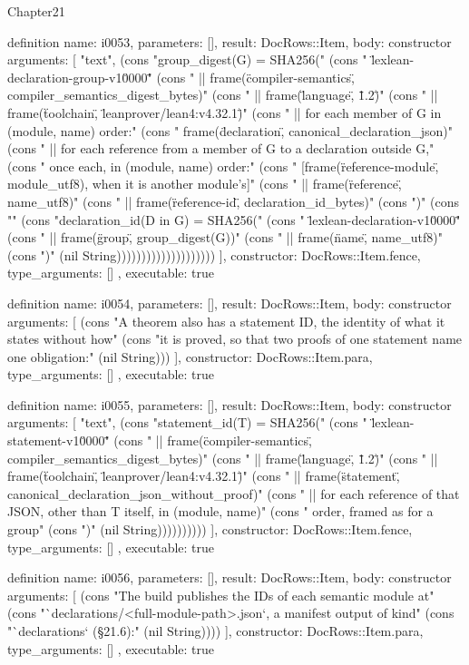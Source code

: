 \begin{lexlean}{Chapter21}
\begin{semanticmodule}
definition{
  name: i0053,
  parameters: [],
  result: DocRows::Item,
  body: constructor{
    arguments: [
      "text",
      (cons "group_digest(G) = SHA256(" (cons "  \"lexlean-declaration-group-v1\u0000\"" (cons "  || frame(\"compiler-semantics\", compiler_semantics_digest_bytes)" (cons "  || frame(\"language\", \"1.2\")" (cons "  || frame(\"toolchain\", \"leanprover/lean4:v4.32.1\")" (cons "  || for each member of G in (module, name) order:" (cons "       frame(\"declaration\", canonical_declaration_json)" (cons "  || for each reference from a member of G to a declaration outside G," (cons "     once each, in (module, name) order:" (cons "       [frame(\"reference-module\", module_utf8), when it is another module's]" (cons "       || frame(\"reference\", name_utf8)" (cons "       || frame(\"reference-id\", declaration_id_bytes)" (cons ")" (cons "" (cons "declaration_id(D in G) = SHA256(" (cons "  \"lexlean-declaration-v1\u0000\"" (cons "  || frame(\"group\", group_digest(G))" (cons "  || frame(\"name\", name_utf8)" (cons ")" (nil String))))))))))))))))))))
    ],
    constructor: DocRows::Item.fence,
    type_arguments: []
  },
  executable: true
}

definition{
  name: i0054,
  parameters: [],
  result: DocRows::Item,
  body: constructor{
    arguments: [
      (cons "A theorem also has a statement ID, the identity of what it states without how" (cons "it is proved, so that two proofs of one statement name one obligation:" (nil String)))
    ],
    constructor: DocRows::Item.para,
    type_arguments: []
  },
  executable: true
}

definition{
  name: i0055,
  parameters: [],
  result: DocRows::Item,
  body: constructor{
    arguments: [
      "text",
      (cons "statement_id(T) = SHA256(" (cons "  \"lexlean-statement-v1\u0000\"" (cons "  || frame(\"compiler-semantics\", compiler_semantics_digest_bytes)" (cons "  || frame(\"language\", \"1.2\")" (cons "  || frame(\"toolchain\", \"leanprover/lean4:v4.32.1\")" (cons "  || frame(\"statement\", canonical_declaration_json_without_proof)" (cons "  || for each reference of that JSON, other than T itself, in (module, name)" (cons "     order, framed as for a group" (cons ")" (nil String))))))))))
    ],
    constructor: DocRows::Item.fence,
    type_arguments: []
  },
  executable: true
}

definition{
  name: i0056,
  parameters: [],
  result: DocRows::Item,
  body: constructor{
    arguments: [
      (cons "The build publishes the IDs of each semantic module at" (cons "`declarations/<full-module-path>.json`, a manifest output of kind" (cons "`declarations` (§21.6):" (nil String))))
    ],
    constructor: DocRows::Item.para,
    type_arguments: []
  },
  executable: true
}


\end{semanticmodule}
\end{lexlean}
